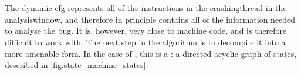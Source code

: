 \section{\STateMachines}
\label{sect:derive:state_machines}


The dynamic \gls{cfg} represents all of the instructions in the
\gls{crashingthread} in the \gls{analysiswindow}, and therefore in
principle contains all of the information needed to analyse the bug.
It is, however, very close to machine code, and is therefore difficult
to work with.  The next step in the algorithm is to decompile it into
a more amenable form.  In the case of {\technique}, this is a
{\StateMachine}: a directed acyclic graph of states, described in
\autoref{fig:state_machine_states}.

